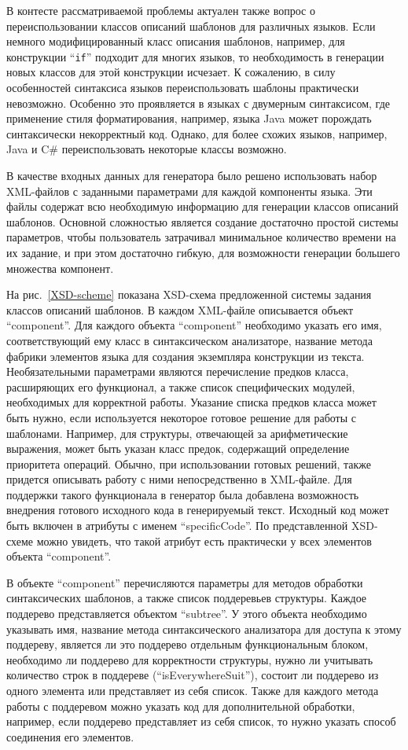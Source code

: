 В контесте рассматриваемой проблемы актуален также вопрос о переиспользовании классов описаний шаблонов для различных языков. Если немного модифицированный класс описания шаблонов, например, для конструкции ``\lstinline{if}'' подходит для многих языков, то необходимость в генерации новых классов для этой конструкции исчезает. К сожалению, в силу особенностей синтаксиса языков переиспользовать шаблоны практически невозможно. Особенно это проявляется в языках с двумерным синтаксисом, где применение стиля форматирования, например, языка Java может порождать синтаксически некорректный код. Однако, для более схожих языков, например, Java и C\# переиспользовать некоторые классы возможно.

В качестве входных данных для генератора было решено использовать набор XML-файлов с заданными параметрами для каждой компоненты языка. Эти файлы содержат всю необходимую информацию для генерации классов описаний шаблонов. Основной сложностью является создание достаточно простой системы параметров, чтобы пользователь затрачивал минимальное количество времени на их задание, и при этом достаточно гибкую, для возможности генерации большего множества компонент.

На рис.~\ref{XSD-scheme} показана XSD-схема предложенной системы задания классов описаний шаблонов. В каждом XML-файле описывается объект ``component''. Для каждого объекта ``component'' необходимо указать его имя, соответствующий ему класс в синтаксическом анализаторе, название метода фабрики элементов языка для создания экземпляра конструкции из текста. Необязательными параметрами являются перечисление предков класса, расширяющих его функционал, а также список специфических модулей, необходимых для корректной работы. Указание списка предков класса может быть нужно, если используется некоторое готовое решение для работы с шаблонами. Например, для структуры, отвечающей за арифметические выражения, может быть указан класс предок, содержащий определение приоритета операций. Обычно, при использовании готовых решений, также придется описывать работу с ними непосредственно в XML-файле. Для поддержки такого функционала в генератор была добавлена возможность внедрения готового исходного кода в генерируемый текст. Исходный код может быть включен в атрибуты с именем ``specificCode''. По представленной XSD-схеме можно увидеть, что такой атрибут есть практически у всех элементов объекта ``component''.

В объекте ``component'' перечисляются параметры для методов обработки синтаксических шаблонов, а также список поддеревьев структуры. Каждое поддерево представляется объектом ``subtree''. У этого объекта необходимо указывать имя, название метода синтаксического анализатора для доступа к этому поддереву, является ли это поддерево отдельным функциональным блоком, необходимо ли поддерево для корректности структуры, нужно ли учитывать количество строк в поддереве (``isEverywhereSuit''), состоит ли поддерево из одного элемента или представляет из себя список. Также для каждого метода работы с поддеревом можно указать код для дополнительной обработки, например, если поддерево представляет из себя список, то нужно указать способ соединения его элементов.

